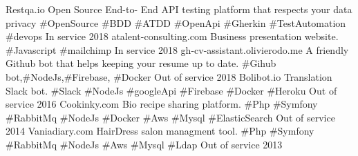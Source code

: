 
\begin{cvhonors}

  \cvhonor
    {Restqa.io} %
    {Open Source End-to- End API testing platform that respects your data privacy \#OpenSource \#BDD  \#ATDD \#OpenApi \#Gherkin \#TestAutomation \#devops}
    {In service} %
    {2018} %
  \cvhonor
    {atalent-consulting.com} %
    {Business presentation website. \#Javascript \#mailchimp}
    {In service} %
    {2018} %
  \cvhonor
    {gh-cv-assistant.olivierodo.me} %
    {A friendly Github bot that helps keeping your resume up to date. \#Gihub bot,\#NodeJs,\#Firebase, \#Docker}
    {Out of service} %
    {2018} %
  \cvhonor
    {Bolibot.io} %
    {Translation Slack bot.  \#Slack \#NodeJs \#googleApi \#Firebase \#Docker \#Heroku}
    {Out of service} %
    {2016} %
  \cvhonor
    {Cookinky.com} %
    {Bio recipe sharing platform. \#Php \#Symfony \#RabbitMq \#NodeJs  \#Docker \#Aws \#Mysql \#ElasticSearch}
    {Out of service} %
    {2014} %
  \cvhonor
    {Vaniadiary.com} %
    {HairDress salon managment tool. \#Php \#Symfony \#RabbitMq \#NodeJs \#Aws \#Mysql \#Ldap}
    {Out of service} %
    {2013} %

\end{cvhonors}







